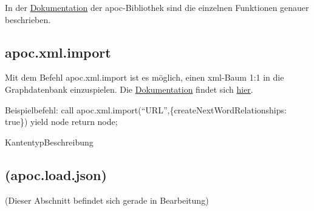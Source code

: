 In der
\href{https://neo4j-contrib.github.io/neo4j-apoc-procedures/}{Dokumentation}
der apoc-Bibliothek sind die einzelnen Funktionen genauer beschrieben.

\hypertarget{apoc.xml.import}{%
\subsection{apoc.xml.import}\label{apoc.xml.import}}

Mit dem Befehl apoc.xml.import ist es möglich, einen xml-Baum 1:1 in die
Graphdatenbank einzuspielen. Die
\href{https://neo4j-contrib.github.io/neo4j-apoc-procedures/\#_import_xml_directly}{Dokumentation}
findet sich
\href{https://neo4j-contrib.github.io/neo4j-apoc-procedures/\#_import_xml_directly}{hier}.

Beispielbefehl: call
apoc.xml.import(``URL'',\{createNextWordRelationships: true\}) yield
node return node;

\textbar Kantentyp\textbar Beschreibung\textbar{}

\hypertarget{apoc.load.json}{%
\subsection{(apoc.load.json)}\label{apoc.load.json}}

(Dieser Abschnitt befindet sich gerade in Bearbeitung)

